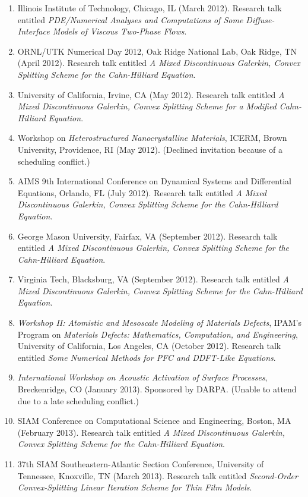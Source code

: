 \documentclass[10pt,letterpaper]{article}
\begin{document}
\begin{enumerate}
	\item
Illinois Institute of Technology, Chicago, IL (March 2012). Research talk entitled {\sl PDE/Numerical Analyses and Computations of Some Diffuse-Interface Models of Viscous Two-Phase Flows}.
	\item
ORNL/UTK Numerical Day 2012, Oak Ridge National Lab, Oak Ridge, TN (April 2012). Research talk entitled {\sl A Mixed Discontinuous Galerkin, Convex Splitting Scheme for the Cahn-Hilliard Equation}.
	\item
University of California, Irvine, CA (May 2012). Research talk entitled {\sl A Mixed Discontinuous Galerkin, Convex Splitting Scheme for a Modified Cahn-Hilliard Equation}.
	\item
Workshop on {\sl Heterostructured Nanocrystalline Materials}, ICERM, Brown University, Providence, RI (May 2012). (Declined invitation because of a scheduling conflict.)
	\item
AIMS 9th International Conference on Dynamical Systems and Differential Equations, Orlando, FL (July 2012). Research talk entitled {\sl A Mixed Discontinuous Galerkin, Convex Splitting Scheme for the Cahn-Hilliard Equation}.
	\item
George Mason University, Fairfax, VA (September 2012). Research talk entitled {\sl A Mixed Discontinuous Galerkin, Convex Splitting Scheme for the Cahn-Hilliard Equation}.
	\item
Virginia Tech, Blacksburg, VA (September 2012). Research talk entitled {\sl A Mixed Discontinuous Galerkin, Convex Splitting Scheme for the Cahn-Hilliard Equation}.
	\item
{\sl Workshop II: Atomistic and Mesoscale Modeling of Materials Defects}, IPAM's Program on {\sl Materials Defects: Mathematics, Computation, and Engineering}, University of California, Los Angeles, CA (October 2012). Research talk entitled {\sl Some Numerical Methods for PFC and DDFT-Like Equations}.
	\item
{\sl International Workshop on Acoustic Activation of Surface Processes},  Breckenridge, CO (January 2013).  Sponsored by DARPA. (Unable to attend due to a late scheduling conflict.)
	\item
SIAM Conference on Computational Science and Engineering, Boston, MA (February 2013).  Research talk entitled {\sl A Mixed Discontinuous Galerkin, Convex Splitting Scheme for the Cahn-Hilliard Equation}.
	\item
37th SIAM Southeastern-Atlantic Section Conference, University of Tennessee, Knoxville, TN (March 2013).  Research talk entitled {\sl Second-Order Convex-Splitting Linear Iteration Scheme for Thin Film Models}.

\end{enumerate}
\end{document}

